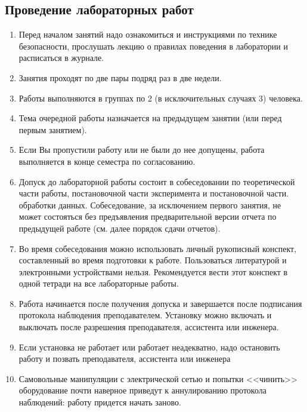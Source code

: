 \subsection{Проведение лабораторных работ}
\begin{enumerate}
    \item Перед началом занятий надо ознакомиться и инструкциями по технике безопасности, прослушать лекцию о правилах поведения в лаборатории и расписаться в журнале.
    \item Занятия проходят по две пары подряд раз в две недели.
    \item Работы выполняются в группах по 2 (в исключительных случаях 3) человека.
    \item Тема очередной работы назначается на предыдущем занятии (или перед первым занятием).
    \item Если Вы пропустили работу или не были до нее допущены, работа выполняется в конце семестра по согласованию.
    \item Допуск до лабораторной работы состоит в собеседовании по теоретической части работы, постановочной части эксперимента и постановочной части. обработки данных. Собеседование, за исключением первого занятия, не может состояться без предъявления предварительной версии отчета по предыдущей работе (см. далее порядок сдачи отчетов).
    \item Во время собеседования можно использовать личный рукописный конспект, составленный во время подготовки к работе. Пользоваться литературой и электронными устройствами нельзя. Рекомендуется вести этот конспект в одной тетради на все лабораторные работы.
    \item Работа начинается после получения допуска и завершается после подписания протокола наблюдения преподавателем. Установку можно включать и выключать после разрешения преподавателя, ассистента или инженера.
    \item Если установка не работает или работает неадекватно, надо остановить работу и позвать преподавателя, ассистента или инженера
    \item Самовольные манипуляции с электрической сетью и попытки <<чинить>> оборудование почти наверное приведут к аннулированию протокола наблюдений: работу придется начать заново.
\end{enumerate}


